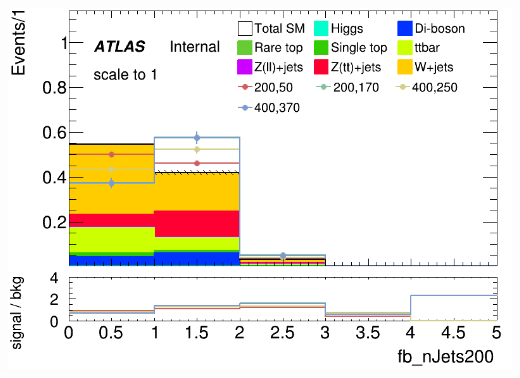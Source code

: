 \documentclass[usenames,dvipsnames]{beamer}
\begin{document}
\begin{frame}
\begin{minipage}{0.32\textwidth}
    \end{minipage}
    \hfill
    \begin{minipage}{0.32\textwidth}
        \centering
        \includegraphics[width=\textwidth]{graphics/LH_met_sig/LH_fb_nJets200_norm.png}
    \end{minipage}
     
    \vspace{0.5cm} %


\end{frame}
\end{document}

